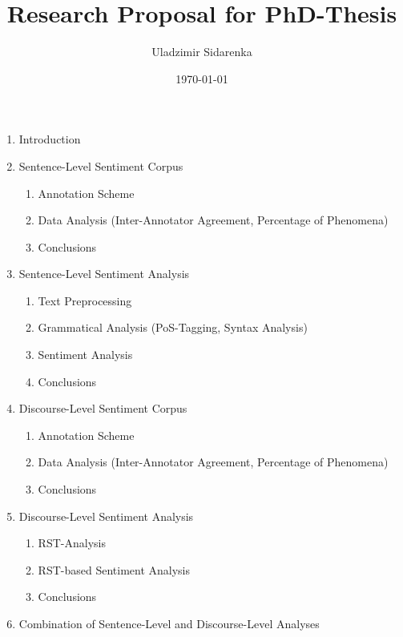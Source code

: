 \documentclass[a4paper,11pt]{article}
\title{Research Proposal for PhD-Thesis}
\author{Uladzimir Sidarenka}
\date{\today}
\begin{document}
\maketitle
\begin{enumerate}
\item Introduction
\item Sentence-Level Sentiment Corpus
  \begin{enumerate}
  \item Annotation Scheme
  \item Data Analysis (Inter-Annotator Agreement, Percentage of Phenomena)
  \item Conclusions
  \end{enumerate}

\item Sentence-Level Sentiment Analysis
  \begin{enumerate}
  \item Text Preprocessing
  \item Grammatical Analysis (PoS-Tagging, Syntax Analysis)
  \item Sentiment Analysis
  \item Conclusions
  \end{enumerate}

\item Discourse-Level Sentiment Corpus
    \begin{enumerate}
      \item Annotation Scheme
      \item Data Analysis (Inter-Annotator Agreement, Percentage of Phenomena)
      \item Conclusions
    \end{enumerate}

\item Discourse-Level Sentiment Analysis
  \begin{enumerate}
  \item RST-Analysis
  \item RST-based Sentiment Analysis
  \item Conclusions
  \end{enumerate}

\item Combination of Sentence-Level and Discourse-Level Analyses
\end{enumerate}
\end{document}
